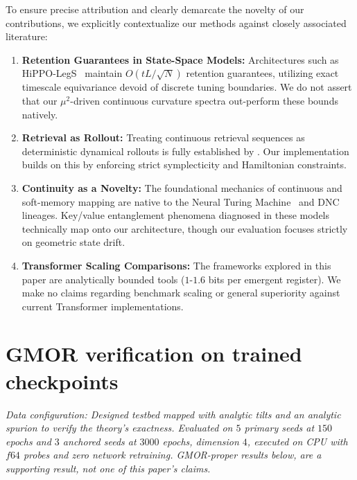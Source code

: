 \documentclass[mlabstract,onecolumn]{jmlr}
\begin{document}
To ensure precise attribution and clearly demarcate the novelty of our contributions, we explicitly contextualize our methods against closely associated literature:

\begin{enumerate}
    \item \textbf{Retention Guarantees in State-Space Models:} Architectures such as HiPPO-LegS~\citep{gu_hippo_2020} maintain $O(tL/\sqrt N)$ retention guarantees, utilizing exact timescale equivariance devoid of discrete tuning boundaries. We do not assert that our $\mu^2$-driven continuous curvature spectra out-perform these bounds natively.
    \item \textbf{Retrieval as Rollout:} Treating continuous retrieval sequences as deterministic dynamical rollouts is fully established by \citet{kong_reservoir-computing_2024}. Our implementation builds on this by enforcing strict symplecticity and Hamiltonian constraints.
    \item \textbf{Continuity as a Novelty:} The foundational mechanics of continuous and soft-memory mapping are native to the Neural Turing Machine~\citep{graves_neural_2014} and DNC lineages. Key/value entanglement phenomena diagnosed in these models~\citep{csords_improving_2019} technically map onto our architecture, though our evaluation focuses strictly on geometric state drift.
    \item \textbf{Transformer Scaling Comparisons:} The frameworks explored in this paper are analytically bounded tools ($1$-$1.6$ bits per emergent register). We make no claims regarding benchmark scaling or general superiority against current Transformer implementations.
\end{enumerate}

\section{GMOR verification on trained checkpoints}\label{app:gmor}

\emph{Data configuration: Designed testbed mapped with analytic tilts and an analytic spurion to verify the theory's exactness. Evaluated on $5$ primary seeds at $150$ epochs and $3$ anchored seeds at $3000$ epochs, dimension $4$, executed on CPU with $f64$ probes and zero network retraining. GMOR-proper results below, are a supporting result, not one of this paper's claims.}
\end{document}
